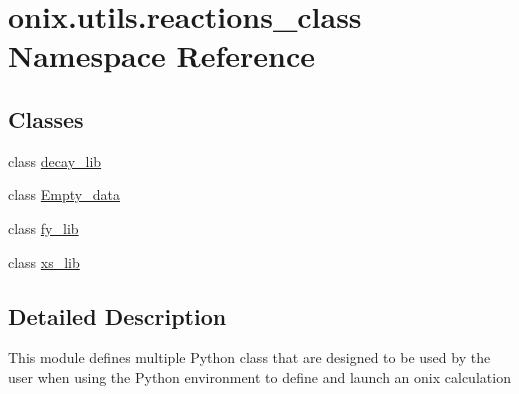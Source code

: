 \hypertarget{namespaceonix_1_1utils_1_1reactions__class}{}\section{onix.\+utils.\+reactions\+\_\+class Namespace Reference}
\label{namespaceonix_1_1utils_1_1reactions__class}
\subsection*{Classes}
\begin{DoxyCompactItemize}
\item 
class \hyperlink{classonix_1_1utils_1_1reactions__class_1_1decay__lib}{decay\+\_\+lib}
\item 
class \hyperlink{classonix_1_1utils_1_1reactions__class_1_1Empty__data}{Empty\+\_\+data}
\item 
class \hyperlink{classonix_1_1utils_1_1reactions__class_1_1fy__lib}{fy\+\_\+lib}
\item 
class \hyperlink{classonix_1_1utils_1_1reactions__class_1_1xs__lib}{xs\+\_\+lib}
\end{DoxyCompactItemize}


\subsection{Detailed Description}
\begin{DoxyVerb}This module defines multiple Python class that are designed to be used by the user when using
the Python environment to define and launch an onix calculation\end{DoxyVerb}
 